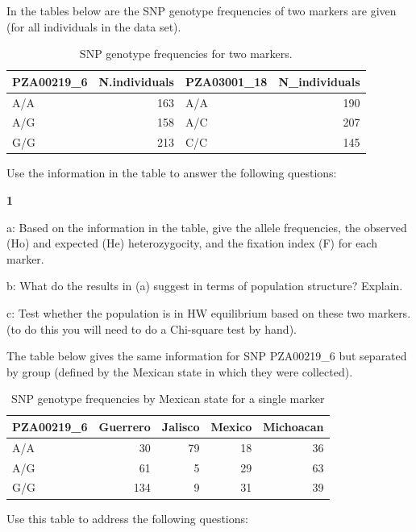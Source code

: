 \documentclass[
]{book}
\makeatletter
\newenvironment{kframe}{%
\medskip{}
\setlength{\fboxsep}{.8em}
 \def\at@end@of@kframe{}%
 \ifinner\ifhmode%
  \def\at@end@of@kframe{\end{minipage}}%
  \begin{minipage}{\columnwidth}%
 \fi\fi%
 \def\FrameCommand##1{\hskip\@totalleftmargin \hskip-\fboxsep
 \colorbox{shadecolor}{##1}\hskip-\fboxsep
     \hskip-\linewidth \hskip-\@totalleftmargin \hskip\columnwidth}%
 \MakeFramed {\advance\hsize-\width
   \@totalleftmargin\z@ \linewidth\hsize
   \@setminipage}}%
 {\par\unskip\endMakeFramed%
 \at@end@of@kframe}
\newenvironment{rmdblock}[1]
  {
  \begin{itemize}
  \renewcommand{\labelitemi}{
    \raisebox{-.7\height}[0pt][0pt]{
      {\setkeys{Gin}{width=3em,keepaspectratio}\texttt{[image: images/\#1]}}
    }
  }
  \setlength{\fboxsep}{1em}
  \begin{kframe}
  \item
  }
  {
  \end{kframe}
  \end{itemize}
  }
\newenvironment{rmdquiz}
  {\begin{rmdblock}{quiz}}
  {\end{rmdblock}}
\makeatother
\begin{document}
In the tables below are the SNP genotype frequencies of two markers are given (for all individuals in the data set).

\begin{table}

\caption{\label{tab:unnamed-chunk-257}SNP genotype frequencies for two markers.}
\centering
\begin{tabular}[t]{lrlr}
\toprule
PZA00219\_6 & N.individuals & PZA03001\_18 & N\_individuals\\
\midrule
A/A & 163 & A/A & 190\\
A/G & 158 & A/C & 207\\
G/G & 213 & C/C & 145\\
\bottomrule
\end{tabular}
\end{table}

Use the information in the table to answer the following questions:

\begin{rmdquiz}
\textbf{1}

a: Based on the information in the table, give the allele frequencies, the observed (Ho) and expected (He) heterozygocity, and the fixation index (F) for each marker.

b: What do the results in (a) suggest in terms of population structure? Explain.

c: Test whether the population is in HW equilibrium based on these two markers. (to do this you will need to do a Chi-square test by hand).
\end{rmdquiz}

The table below gives the same information for SNP PZA00219\_6 but separated by group (defined by the Mexican state in which they were collected).

\begin{table}

\caption{\label{tab:unnamed-chunk-259}SNP genotype frequencies by Mexican state for a single marker}
\centering
\begin{tabular}[t]{lrrrr}
\toprule
PZA00219\_6 & Guerrero & Jalisco & Mexico & Michoacan\\
\midrule
A/A & 30 & 79 & 18 & 36\\
A/G & 61 & 5 & 29 & 63\\
G/G & 134 & 9 & 31 & 39\\
\bottomrule
\end{tabular}
\end{table}

Use this table to address the following questions:
\end{document}
